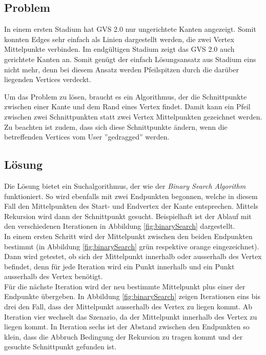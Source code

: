 \documentclass[11pt,a4paper,english,oneside]{book}
\numberwithin{equation}{chapter}
\begin{document}
	\subsection{Problem}
	In einem ersten Stadium hat GVS 2.0 nur ungerichtete Kanten angezeigt. Somit konnten Edges sehr einfach als Linien dargestellt werden, die zwei Vertex Mittelpunkte verbinden. Im endgültigen Stadium zeigt das GVS 2.0 auch gerichtete Kanten an. Somit genügt der einfach Lösungsansatz aus Stadium eins nicht mehr, denn bei diesem Ansatz werden Pfeilspitzen durch die darüber liegenden Vertices verdeckt.
	
	Um das Problem zu lösen, braucht es ein Algorithmus, der die Schnittpunkte zwischen einer Kante und dem Rand eines Vertex findet. Damit kann ein Pfeil zwischen zwei Schnittpunkten statt zwei Vertex Mittelpunkten gezeichnet werden. Zu beachten ist zudem, dass sich diese Schnittpunkte ändern, wenn die betreffenden Vertices vom User ''gedragged'' werden.
	
	\subsection{Lösung}
	Die Lösung bietet ein Suchalgorithmus, der wie der \textit{Binary Search Algorithm} \cite{adbook} funktioniert. So wird ebenfalls mit zwei Endpunkten begonnen, welche in diesem Fall den Mittelpunkten des Start- und Endvertex der Kante entsprechen. Mittels Rekursion wird dann der Schnittpunkt gesucht. Beispielhaft ist der Ablauf mit den verschiedenen Iterationen in Abbildung \ref{fig:binarySearch} dargestellt. \\
	In einem ersten Schritt wird der Mittelpunkt zwischen den beiden Endpunkten bestimmt (in Abbildung  \ref{fig:binarySearch} grün respektive orange eingezeichnet). Dann wird getestet, ob sich der Mittelpunkt innerhalb oder ausserhalb des Vertex befindet, denn für jede Iteration wird ein Punkt innerhalb und ein Punkt ausserhalb des Vertex benötigt. \\
	Für die nächste Iteration wird der neu bestimmte Mittelpunkt plus einer der Endpunkte übergeben. In Abbildung  \ref{fig:binarySearch} zeigen Iterationen eins bis drei den Fall, dass der Mittelpunkt ausserhalb des Vertex zu liegen kommt. Ab Iteration vier wechselt das Szenario, da der Mittelpunkt innerhalb des Vertex zu liegen kommt. In Iteration sechs ist der Abstand zwischen den Endpunkten so klein, dass die Abbruch Bedingung der Rekursion zu tragen kommt und der gesuchte Schnittpunkt gefunden ist. \\
	
\end{document}
